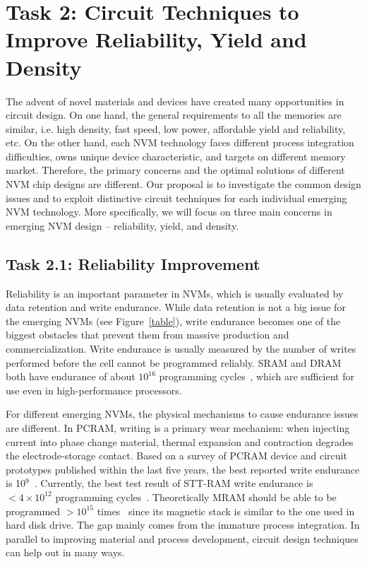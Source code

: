
\section{Task 2: Circuit Techniques to Improve Reliability, Yield and Density}
The advent of novel materials and devices have created many opportunities in circuit design. On one hand, the general requirements to all the memories are similar, i.e. high density, fast speed, low power, affordable yield and reliability, etc. On the other hand, each NVM technology faces different process integration difficulties, owns unique device characteristic, and targets on different memory market. Therefore, the primary concerns and the optimal solutions of different NVM chip designs are different. Our proposal is to investigate the common design issues and to exploit distinctive circuit techniques for each individual emerging NVM technology. More specifically, we will focus on three main concerns in emerging NVM design -- reliability, yield, and density.

\subsection{Task 2.1: Reliability Improvement}
Reliability is an important parameter in NVMs, which is usually evaluated by data retention and write endurance. While data retention is not a big issue for the emerging NVMs (see Figure~\ref{table}), write endurance becomes one of the biggest obstacles that prevent them from massive production and commercialization. Write endurance is usually measured by the number of writes performed before the cell cannot be programmed reliably. SRAM and DRAM both have endurance of about $10^{16}$ programming cycles~\cite{ITRS07}, which are sufficient for use even in high-performance processors.

For different emerging NVMs, the physical mechanisms to cause endurance issues are different. In PCRAM, writing is a primary wear mechanism: when injecting current into phase change material, thermal expansion and contraction degrades the electrode-storage contact. Based on a survey of PCRAM device and circuit prototypes published within the last five years, the best reported write endurance is 10$^9$~\cite{Lee09}. Currently, the best test result of STT-RAM write endurance is $<4\times10^{12}$ programming cycles~\cite{Diao07}. Theoretically MRAM should be able to be programmed $>10^{15}$ times~\cite{ITRS07} since its magnetic stack is similar to the one used in hard disk drive. The gap mainly comes from the immature process integration. In parallel to improving material and process development, circuit design techniques can help out in many ways.

